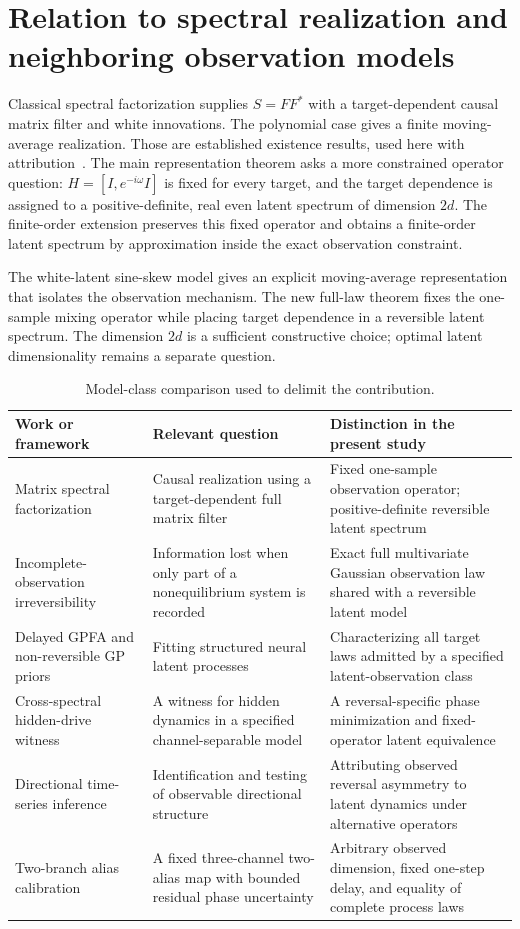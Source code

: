 \section{Relation to spectral realization and neighboring observation models}
Classical spectral factorization supplies $S=FF^*$ with a target-dependent causal matrix filter and white innovations. The polynomial case gives a finite moving-average realization. Those are established existence results, used here with attribution~\cite{ephremidze2007,ephremidze2014}. The main representation theorem asks a more constrained operator question: $H=[I,e^{-i\omega}I]$ is fixed for every target, and the target dependence is assigned to a positive-definite, real even latent spectrum of dimension $2d$. The finite-order extension preserves this fixed operator and obtains a finite-order latent spectrum by approximation inside the exact observation constraint.

The white-latent sine-skew model gives an explicit moving-average representation that isolates the observation mechanism. The new full-law theorem fixes the one-sample mixing operator while placing target dependence in a reversible latent spectrum. The dimension $2d$ is a sufficient constructive choice; optimal latent dimensionality remains a separate question.

\begin{table}[ht]\small
\caption{Model-class comparison used to delimit the contribution.}
\begin{tabularx}{\linewidth}{p{.23\linewidth}XX}\toprule
Work or framework & Relevant question & Distinction in the present study\\\midrule
Matrix spectral factorization & Causal realization using a target-dependent full matrix filter & Fixed one-sample observation operator; positive-definite reversible latent spectrum\\
Incomplete-observation irreversibility~\cite{lucente2022} & Information lost when only part of a nonequilibrium system is recorded & Exact full multivariate Gaussian observation law shared with a reversible latent model\\
Delayed GPFA and non-reversible GP priors~\cite{gokcen2015,rutten2020} & Fitting structured neural latent processes & Characterizing all target laws admitted by a specified latent-observation class\\
Cross-spectral hidden-drive witness~\cite{bi2026} & A witness for hidden dynamics in a specified channel-separable model & A reversal-specific phase minimization and fixed-operator latent equivalence\\
Directional time-series inference~\cite{bhandari2026} & Identification and testing of observable directional structure & Attributing observed reversal asymmetry to latent dynamics under alternative operators\\
Two-branch alias calibration~\cite{xu2026} & A fixed three-channel two-alias map with bounded residual phase uncertainty & Arbitrary observed dimension, fixed one-step delay, and equality of complete process laws\\\bottomrule
\end{tabularx}
\end{table}

